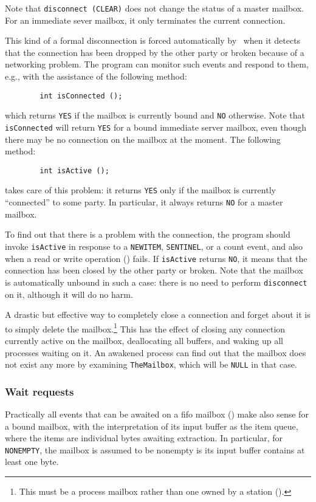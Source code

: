 Note that {\tt disconnect~(CLEAR)} does not change the status of a
master mailbox.
For an immediate sever mailbox, it only terminates the current connection.

This kind of a formal disconnection is forced automatically by \smurph\ when
it detects that the connection has been dropped by the other party or
broken because of a networking problem.
The program can monitor such events and respond to them, e.g.,
with the assistance of the following method:
\begin{verbatim}
        int isConnected ();
\end{verbatim}
which returns {\tt YES} if the mailbox is currently bound and {\tt NO}
otherwise.
Note that {\tt isConnected} will return {\tt YES} for a bound immediate
server mailbox, even though there may be no connection on the
mailbox at the moment.
The following method:
\begin{verbatim}
        int isActive ();
\end{verbatim}
takes care of this problem: it
returns {\tt YES} only if the mailbox is currently ``connected'' to
some party.
In particular, it always returns {\tt NO} for a master mailbox.

To find out that there is a problem with the connection, the program should
invoke {\tt isActive} in response to a {\tt NEWITEM}, {\tt SENTINEL}, or
a count event, and also when a read or write operation ()
fails.
If {\tt isActive} returns {\tt NO}, it means that the connection has
been closed by the other party or broken.
Note that the mailbox is automatically unbound in such a case:
there is no need to perform {\tt disconnect} on it, although it will
do no harm.

A drastic but effective way to completely close a connection and forget about
it is to simply delete the mailbox.\footnote{This must be a process mailbox
rather than one owned by a station ().}
This has the effect of closing any connection currently active on the mailbox,
deallocating all buffers, and waking up all processes waiting on it.
An awakened process can find out that the mailbox does not exist any more
by examining {\tt TheMailbox}, which will be {\tt NULL} in that case.

\subsubsection{Wait requests}
\label{rm_mb_bo_wr}

Practically all events that can be awaited on a fifo mailbox
() make also sense for a bound mailbox, with the
interpretation of its input buffer as the item queue, where the items
are individual bytes awaiting extraction.
In particular, for {\tt NONEMPTY}, the mailbox is assumed to be nonempty
is its input buffer contains at least one byte.


